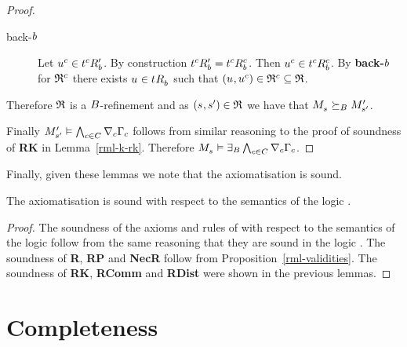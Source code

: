 \begin{proof}
\begin{description}
\begin{description}
            \item[back-$\agentB$]
                Let $\kStateU[\agentC] \in \kSuccessorsPB{\kStateT[\agentC]}$.
                By construction $\kSuccessorsPB{\kStateT[\agentC]} = \kSuccessorsB[\agentC]{\kStateT[\agentC]}$.
                Then $\kStateU[\agentC] \in \kSuccessorsB[\agentC]{\kStateT[\agentC]}$.
                By {\bf back-$\agentB$} for $\refinement^\agentC$ there exists $\kStateU \in \kSuccessorsB{\kStateT}$ such that $(\kStateU, \kStateU[\agentC]) \in \refinement^\agentC \subseteq \refinement$.
        \end{description}
\end{description}

Therefore $\refinement$ is a $\agentsB$-refinement and as $(\kStateS, \kStateSP) \in \refinement$ we have that $\kPModel{\kStateS} \simulatesBs \kPModelP{\kStateSP}$.

Finally $\kPModelP{\kStateSP} \entails \bigwedge_{\agentC \in \agentsC} \coversC \Gamma_\agentC$ follows from similar reasoning to the proof of soundness of {\bf RK} in Lemma~\ref{rml-k-rk}.
Therefore $\kPModel{\kStateS} \entails \somerefsBs \bigwedge_{\agentC \in \agentsC} \coversC \Gamma_\agentC$.
\end{proof}

Finally, given these lemmas we note that the axiomatisation \axiomRmlK{} is sound.

\begin{lemma}\label{rml-k-sound}
The axiomatisation \axiomRmlK{} is sound with respect to the semantics of the logic \logicRmlK{}.
\end{lemma}

\begin{proof}
The soundness of the axioms and rules of \axiomK{} with respect to the semantics of the logic \logicRmlK{} follow from the same reasoning that they are sound in the logic \logicK{}.
The soundness of {\bf R}, {\bf RP} and {\bf NecR} follow from Proposition~\ref{rml-validities}.
The soundness of {\bf RK}, {\bf RComm} and {\bf RDist} were shown in the previous lemmas.
\end{proof}

\section{Completeness}\label{rml-k-completeness}

